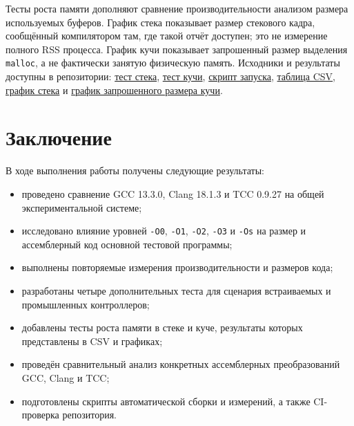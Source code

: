 \documentclass[a4paper]{article}
\begin{document}
Тесты роста памяти дополняют сравнение производительности анализом размера используемых буферов. График стека показывает размер стекового кадра, сообщённый компилятором там, где такой отчёт доступен; это не измерение полного RSS процесса. График кучи показывает запрошенный размер выделения \texttt{malloc}, а не фактически занятую физическую память. Исходники и результаты доступны в репозитории: \href{https://github.com/atsa111/compiler-optimization-study/blob/main/src/memory_stack.c}{тест стека}, \href{https://github.com/atsa111/compiler-optimization-study/blob/main/src/memory_heap.c}{тест кучи}, \href{https://github.com/atsa111/compiler-optimization-study/blob/main/scripts/memory_growth.sh}{скрипт запуска}, \href{https://github.com/atsa111/compiler-optimization-study/blob/main/results/memory-growth/memory-growth.csv}{таблица CSV}, \href{https://github.com/atsa111/compiler-optimization-study/blob/main/results/memory-growth/stack-growth.png}{график стека} и \href{https://github.com/atsa111/compiler-optimization-study/blob/main/results/memory-growth/heap-requested-size.png}{график запрошенного размера кучи}.

\section{Заключение}

В ходе выполнения работы получены следующие результаты:

\begin{itemize}[nosep]
    \item проведено сравнение GCC 13.3.0, Clang 18.1.3 и TCC 0.9.27 на общей экспериментальной системе;
    \item исследовано влияние уровней \texttt{-O0}, \texttt{-O1}, \texttt{-O2}, \texttt{-O3} и \texttt{-Os} на размер и ассемблерный код основной тестовой программы;
    \item выполнены повторяемые измерения производительности и размеров кода;
    \item разработаны четыре дополнительных теста для сценария встраиваемых и промышленных контроллеров;
    \item добавлены тесты роста памяти в стеке и куче, результаты которых представлены в CSV и графиках;
    \item проведён сравнительный анализ конкретных ассемблерных преобразований GCC, Clang и TCC;
    \item подготовлены скрипты автоматической сборки и измерений, а также CI-проверка репозитория.
\end{itemize}
\end{document}
